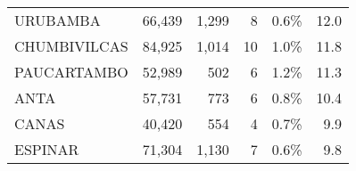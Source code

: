 \begin{tabular}{lrrrrr}
	URUBAMBA                              & 66,439                                                         & 1,299                                                                            & 8                                                                & 0.6\%                                                                  & 12.0                                                                                                                              \\
	CHUMBIVILCAS                          & 84,925                                                         & 1,014                                                                            & 10                                                               & 1.0\%                                                                  & 11.8                                                                                                                              \\
	PAUCARTAMBO                           & 52,989                                                         & 502                                                                              & 6                                                                & 1.2\%                                                                  & 11.3                                                                                                                              \\
	ANTA                                  & 57,731                                                         & 773                                                                              & 6                                                                & 0.8\%                                                                  & 10.4                                                                                                                              \\
	CANAS                                 & 40,420                                                         & 554                                                                              & 4                                                                & 0.7\%                                                                  & 9.9                                                                                                                               \\
	ESPINAR                               & 71,304                                                         & 1,130                                                                            & 7                                                                & 0.6\%                                                                  & 9.8                                                                                                                               \\

\end{tabular}
